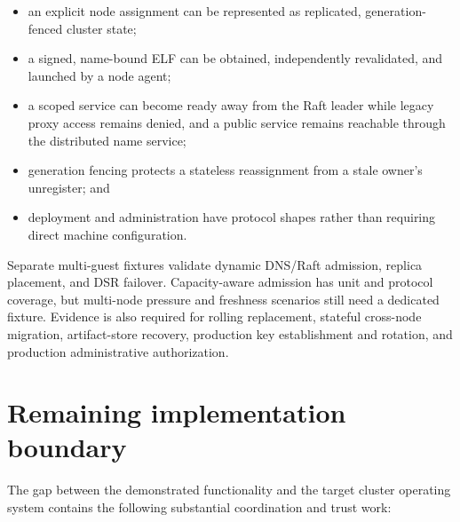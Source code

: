 \begin{itemize}
    \item an explicit node assignment can be represented as replicated,
        generation-fenced cluster state;
    \item a signed, name-bound ELF can be obtained, independently revalidated,
        and launched by a node agent;
    \item a scoped service can become ready away from the Raft leader while
        legacy proxy access remains denied, and a public service remains
        reachable through the distributed name service;
    \item generation fencing protects a stateless reassignment from a stale
        owner's unregister; and
    \item deployment and administration have protocol shapes rather than
        requiring direct machine configuration.
\end{itemize}

Separate multi-guest fixtures validate dynamic DNS/Raft admission, replica
placement, and DSR failover. Capacity-aware admission has unit and protocol
coverage, but multi-node pressure and freshness scenarios still need a dedicated
fixture. Evidence is also required for rolling replacement, stateful cross-node
migration, artifact-store recovery, production key establishment and rotation,
and production administrative authorization.

\section{Remaining implementation boundary}

The gap between the demonstrated functionality and the target cluster operating
system contains the following substantial coordination and trust work:

